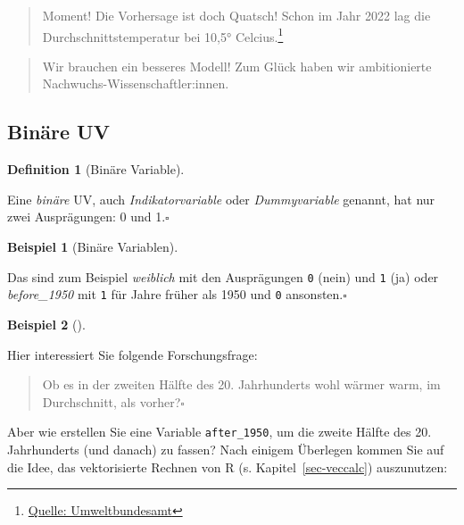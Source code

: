 \documentclass[
  letterpaper,
]{scrbook}
\theoremstyle{definition}
\newtheorem{example}{Beispiel}[chapter]
\theoremstyle{definition}
\newtheorem{definition}{Definition}[chapter]
\theoremstyle{definition}
\theoremstyle{remark}
\begin{document}
\begin{quote}
{} Moment! Die Vorhersage ist doch Quatsch! Schon im Jahr
2022 lag die Durchschnittstemperatur bei 10,5° Celcius.\footnote{\href{https://www.umweltbundesamt.de/daten/klima/trends-der-lufttemperatur\#steigende-durchschnittstemperaturen-weltweit}{Quelle:
  Umweltbundesamt}}
\end{quote}

\begin{quote}
{} Wir brauchen ein besseres Modell! Zum Glück haben wir
ambitionierte Nachwuchs-Wissenschaftler:innen.
\end{quote}

\subsection{Binäre UV}\label{binuxe4re-uv}

\begin{definition}[Binäre
Variable]\protect\hypertarget{def-binvar}{}\label{def-binvar}

Eine \emph{binäre} UV, auch \emph{Indikatorvariable} oder
\emph{Dummyvariable} genannt, hat nur zwei Ausprägungen: 0 und
1.\(\square\)

\end{definition}

\begin{example}[Binäre
Variablen]\protect\hypertarget{exm-bin}{}\label{exm-bin}

Das sind zum Beispiel \emph{weiblich} mit den Ausprägungen \texttt{0}
(nein) und \texttt{1} (ja) oder \emph{before\_1950} mit \texttt{1} für
Jahre früher als 1950 und \texttt{0} ansonsten.\(\square\)

\end{example}

\begin{example}[]\protect\hypertarget{exm-binuv}{}\label{exm-binuv}

Hier interessiert Sie folgende Forschungsfrage:

\begin{quote}
{} Ob es in der zweiten Hälfte des 20. Jahrhunderts wohl
wärmer warm, im Durchschnitt, als vorher?\(\square\)
\end{quote}

\end{example}

Aber wie erstellen Sie eine Variable \texttt{after\_1950}, um die zweite
Hälfte des 20. Jahrhunderts (und danach) zu fassen? Nach einigem
Überlegen kommen Sie auf die Idee, das vektorisierte Rechnen von R (s.
Kapitel~\ref{sec-veccalc}) auszunutzen:
\end{document}

